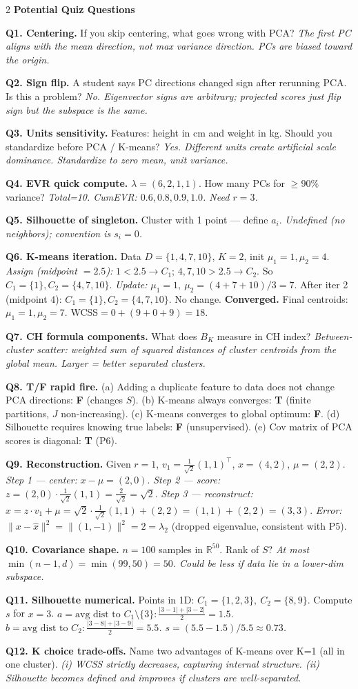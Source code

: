 \documentclass[10pt,fleqn]{article}
\newcommand{\R}{\mathbb{R}}
\newcommand{\shead}[1]{\vspace{0.1ex}\textbf{\scriptsize #1}\par}
\newcommand{\qa}[2]{\textbf{#1} #2\par}
\begin{document}
\begin{multicols*}{2}
\shead{Potential Quiz Questions}
\qa{Q1. Centering.}{If you skip centering, what goes wrong with PCA? \textit{The first PC aligns with the mean direction, not max variance direction. PCs are biased toward the origin.}}
\qa{Q2. Sign flip.}{A student says PC directions changed sign after rerunning PCA. Is this a problem? \textit{No. Eigenvector signs are arbitrary; projected scores just flip sign but the subspace is the same.}}
\qa{Q3. Units sensitivity.}{Features: height in cm and weight in kg. Should you standardize before PCA / K-means? \textit{Yes. Different units create artificial scale dominance. Standardize to zero mean, unit variance.}}
\qa{Q4. EVR quick compute.}{\(\lambda=(6,2,1,1)\). How many PCs for \(\ge 90\%\) variance? \textit{Total=10. CumEVR: \(0.6,0.8,0.9,1.0\). Need \(r=3\).}}
\qa{Q5. Silhouette of singleton.}{Cluster with 1 point — define \(a_i\). \textit{Undefined (no neighbors); convention is \(s_i=0\).}}
\qa{Q6. K-means iteration.}{Data \(D=\{1,4,7,10\}\), \(K=2\), init \(\mu_1=1,\mu_2=4\). \textit{Assign (midpoint \(=2.5\)):} \(1<2.5\to C_1\); \(4,7,10>2.5\to C_2\). So \(C_1=\{1\}, C_2=\{4,7,10\}\). \textit{Update:} \(\mu_1=1,\ \mu_2=(4+7+10)/3=7\). After iter 2 (midpoint \(4\)): \(C_1=\{1\},C_2=\{4,7,10\}\). No change. \textbf{Converged.} Final centroids: \(\boxed{\mu_1=1,\mu_2=7}\). WCSS\(=0+(9+0+9)=18\).}
\qa{Q7. CH formula components.}{What does \(B_K\) measure in CH index? \textit{Between-cluster scatter: weighted sum of squared distances of cluster centroids from the global mean. Larger = better separated clusters.}}
\qa{Q8. T/F rapid fire.}{(a) Adding a duplicate feature to data does not change PCA directions: \textbf{F} (changes \(S\)). (b) K-means always converges: \textbf{T} (finite partitions, \(J\) non-increasing). (c) K-means converges to global optimum: \textbf{F}. (d) Silhouette requires knowing true labels: \textbf{F} (unsupervised). (e) Cov matrix of PCA scores is diagonal: \textbf{T} (P6).}
\qa{Q9. Reconstruction.}{Given \(r=1\), \(v_1=\tfrac1{\sqrt2}(1,1)^\top\), \(x=(4,2)\), \(\mu=(2,2)\). \textit{Step 1 — center:} \(x-\mu=(2,0)\). \textit{Step 2 — score:} \(z=(2,0)\cdot\tfrac1{\sqrt2}(1,1)=\tfrac{2}{\sqrt2}=\sqrt2\). \textit{Step 3 — reconstruct:} \(\hat x = z\cdot v_1+\mu = \sqrt2\cdot\tfrac1{\sqrt2}(1,1)+(2,2)=(1,1)+(2,2)=\boxed{(3,3)}\). \textit{Error:} \(\|x-\hat x\|^2=\|(1,-1)\|^2=2=\lambda_2\) (dropped eigenvalue, consistent with P5).}
\qa{Q10. Covariance shape.}{\(n=100\) samples in \(\R^{50}\). Rank of \(S\)? \textit{At most \(\min(n-1,d)=\min(99,50)=50\). Could be less if data lie in a lower-dim subspace.}}
\qa{Q11. Silhouette numerical.}{Points in 1D: \(C_1=\{1,2,3\},\ C_2=\{8,9\}\). Compute \(s\) for \(x=3\). \textit{\(a=\text{avg dist to }C_1\setminus\{3\}: \frac{|3-1|+|3-2|}2=1.5\). \(b=\text{avg dist to }C_2:\frac{|3-8|+|3-9|}2=5.5\). \(s=(5.5-1.5)/5.5\approx0.73\).}}
\qa{Q12. K choice trade-offs.}{Name two advantages of K-means over K=1 (all in one cluster). \textit{(i) WCSS strictly decreases, capturing internal structure. (ii) Silhouette becomes defined and improves if clusters are well-separated.}}


\end{multicols*}
\end{document}
